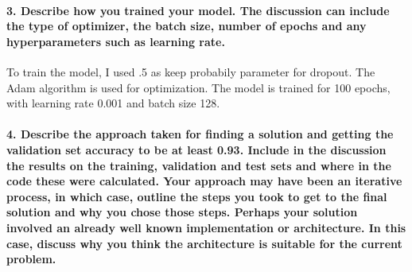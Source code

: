 \documentclass[11pt]{article}
\begin{document}
    \hypertarget{describe-how-you-trained-your-model.-the-discussion-can-include-the-type-of-optimizer-the-batch-size-number-of-epochs-and-any-hyperparameters-such-as-learning-rate.}{%
\paragraph{3. Describe how you trained your model. The discussion can
include the type of optimizer, the batch size, number of epochs and any
hyperparameters such as learning
rate.}\label{describe-how-you-trained-your-model.-the-discussion-can-include-the-type-of-optimizer-the-batch-size-number-of-epochs-and-any-hyperparameters-such-as-learning-rate.}}

To train the model, I used .5 as keep probabily parameter for dropout.
The Adam algorithm is used for optimization. The model is trained for
100 epochs, with learning rate 0.001 and batch size 128.

    \hypertarget{describe-the-approach-taken-for-finding-a-solution-and-getting-the-validation-set-accuracy-to-be-at-least-0.93.-include-in-the-discussion-the-results-on-the-training-validation-and-test-sets-and-where-in-the-code-these-were-calculated.-your-approach-may-have-been-an-iterative-process-in-which-case-outline-the-steps-you-took-to-get-to-the-final-solution-and-why-you-chose-those-steps.-perhaps-your-solution-involved-an-already-well-known-implementation-or-architecture.-in-this-case-discuss-why-you-think-the-architecture-is-suitable-for-the-current-problem.}{%
\paragraph{4. Describe the approach taken for finding a solution and
getting the validation set accuracy to be at least 0.93. Include in the
discussion the results on the training, validation and test sets and
where in the code these were calculated. Your approach may have been an
iterative process, in which case, outline the steps you took to get to
the final solution and why you chose those steps. Perhaps your solution
involved an already well known implementation or architecture. In this
case, discuss why you think the architecture is suitable for the current
problem.}\label{describe-the-approach-taken-for-finding-a-solution-and-getting-the-validation-set-accuracy-to-be-at-least-0.93.-include-in-the-discussion-the-results-on-the-training-validation-and-test-sets-and-where-in-the-code-these-were-calculated.-your-approach-may-have-been-an-iterative-process-in-which-case-outline-the-steps-you-took-to-get-to-the-final-solution-and-why-you-chose-those-steps.-perhaps-your-solution-involved-an-already-well-known-implementation-or-architecture.-in-this-case-discuss-why-you-think-the-architecture-is-suitable-for-the-current-problem.}}
\end{document}
